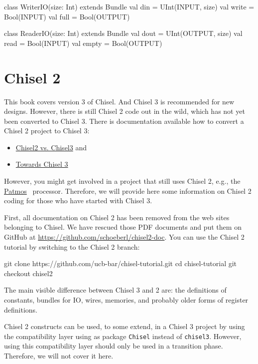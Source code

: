 \documentclass[%
    10pt, %
    headinclude, footexclude,
    openright, %
    notitlepage,
    cleardoubleempty,
    headsepline,
    pointlessnumbers,
    bibtotoc, idxtotoc,
    ]{scrbook}
\newcommand{\code}[1]{{\small{\texttt{#1}}}}
\newcommand{\myref}[2]{\href{#1}{#2}}
\begin{document}
\begin{chisel}
class WriterIO(size: Int) extends Bundle {
  val din = UInt(INPUT, size)
  val write = Bool(INPUT)
  val full = Bool(OUTPUT)
}

class ReaderIO(size: Int) extends Bundle {
  val dout = UInt(OUTPUT, size)
  val read = Bool(INPUT)
  val empty = Bool(OUTPUT)
}
\end{chisel}

\chapter{Chisel 2}

This book covers version 3 of Chisel. And Chisel 3 is recommended for new designs.
However, there is still Chisel 2 code out in the wild, which has not yet been converted
to Chisel 3. There is documentation available how to convert a Chisel 2 project to
Chisel 3:

\begin{itemize}
\item \myref{https://github.com/freechipsproject/chisel3/wiki/Chisel3-vs-Chisel2}{Chisel2 vs. Chisel3} and
\item \myref{https://github.com/schoeberl/chisel-examples/blob/master/TowardsChisel3.md}{Towards Chisel 3}
\end{itemize}

However, you might get involved in a project that still uses Chisel 2,
e.g., the \myref{https://github.com/t-crest/patmos}{Patmos}~\cite{patmos:rts2018} processor.
Therefore, we will provide here some information on Chisel 2 coding for those who
have started with Chisel 3.

First, all documentation on Chisel 2 has been removed from the web sites
belonging to Chisel. We have rescued those PDF documents and put them
on GitHub at \url{https://github.com/schoeberl/chisel2-doc}.
You can use the Chisel 2 tutorial by switching to the Chisel 2 branch:

\begin{chisel}
git clone https://github.com/ucb-bar/chisel-tutorial.git
cd chisel-tutorial
git checkout chisel2
\end{chisel}

The main visible difference between Chisel 3 and 2 are: the definitions of
constants, bundles for IO, wires, memories, and probably older forms of register
definitions.

Chisel 2 constructs can be used, to some extend, in a Chisel 3 project by
using the compatibility layer using as package \code{Chisel} instead of \code{chisel3}.
However, using this compatibility layer should only be used in a transition phase.
Therefore, we will not cover it here.
\end{document}
